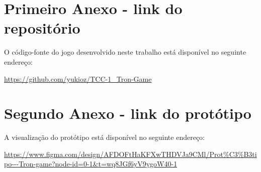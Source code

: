 \begin{anexosenv}

\partanexos

\chapter{Primeiro Anexo - link do repositório}

O código-fonte do jogo desenvolvido neste trabalho está disponível no seguinte endereço:

\vspace{0.5cm}

\url{https://github.com/yukioz/TCC-1_Tron-Game}

\chapter{Segundo Anexo - link do protótipo}

A visualização do protótipo está disponível no seguinte endereço:

\vspace{0.5cm}

\url{https://www.figma.com/design/AFDOFtHaKFXwTHDVJa9CMl/Prot%C3%B3tipo---Tron-game?node-id=0-1&t=wq8JGf6yV9ygoW40-1}


\end{anexosenv}
